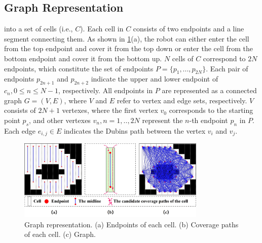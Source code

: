 \documentclass[journal,article,submit,pdftex,moreauthors]{Definitions/mdpi}
\begin{document}
\subsection{Graph Representation}
  into a set of cells (i.e., $C$). Each cell in $C$ consists of two endpoints and a line segment connecting them. As shown in \ref{Fig_graph_representation}(a), the robot can either enter the cell from the top endpoint and cover it from the top down or enter the cell from the bottom endpoint and cover it from the bottom up. $N$ cells of $C$ correspond to $2N$ endpoints, which constitute the set of endpoints $P=\{p_1,...,p_{2N}\}$. Each pair of endpoints $p_{2n+1}$ and $p_{2n+2}$ indicate the upper and lower endpoint of $c_n, 0\leq n \leq N-1$, respectively. All endpoints in $P$ are represented as a connected graph $G = (V, E)$, where $V$ and $E$ refer to vertex and edge sets, respectively. $V$ consists of $2N+1$ vertexes, where the first vertex $v_0$ corresponds to the starting point $p_s$, and other vertexes $v_n, n=1,..,2N$ represent the $n$-th endpoint $p_n$ in $P$. Each edge $e_{i,j} \in E$ indicates the Dubins path between the vertex $v_i$ and $v_j$. 

\begin{figure}[htb] %
	\centering  %
    \vspace{0 cm} %
    \includegraphics[width=0.8\textwidth]{2.jpg}
    \caption{ Graph representation. (a) Endpoints of each cell. (b) Coverage paths of each cell. (c) Graph.}
   \label{Fig_graph_representation}
\end{figure}
\end{document}
